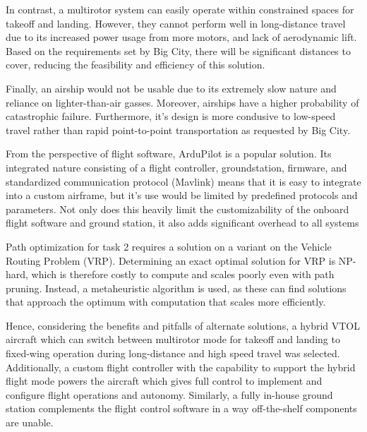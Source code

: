 In contrast, a multirotor system can easily operate within constrained spaces
for takeoff and landing. However, they cannot perform well in long-distance
travel due to its increased power usage from more motors, and lack of
aerodynamic lift. Based on the requirements set by Big City, there will be
significant distances to cover, reducing the feasibility and efficiency of this
solution.

Finally, an airship would not be usable due to its extremely slow nature and
reliance on lighter-than-air gasses. Moreover, airships have a higher
probability of catastrophic failure. Furthermore, it's design is more condusive
to low-speed travel rather than rapid point-to-point transportation as
requested by Big City. 

From the perspective of flight software, ArduPilot is a popular solution. Its
integrated nature consisting of a flight controller, groundstation, firmware,
and standardized communication protocol (Mavlink) means that it is easy to
integrate into a custom airframe, but it's use would be limited by predefined
protocols and parameters. Not only does this heavily limit the customizability
of the onboard flight software and ground station, it also adds significant
overhead to all systems

Path optimization for task 2 requires a solution on a variant on the Vehicle
Routing Problem (VRP). Determining an exact optimal solution for VRP is
NP-hard, which is therefore costly to compute and scales poorly even with path
pruning. Instead, a metaheuristic algorithm is used, as these can find
solutions that approach the optimum with computation that scales more
efficiently.

Hence, considering the benefits and pitfalls of alternate solutions, a hybrid VTOL aircraft which can switch between multirotor mode for takeoff and landing
to fixed-wing operation during long-distance and high speed travel was
selected. Additionally, a custom flight controller with the capability to
support the hybrid flight mode powers the aircraft which gives full control to
implement and configure flight operations and autonomy. Similarly, a fully
in-house ground station complements the flight control software in a way
off-the-shelf components are unable.
